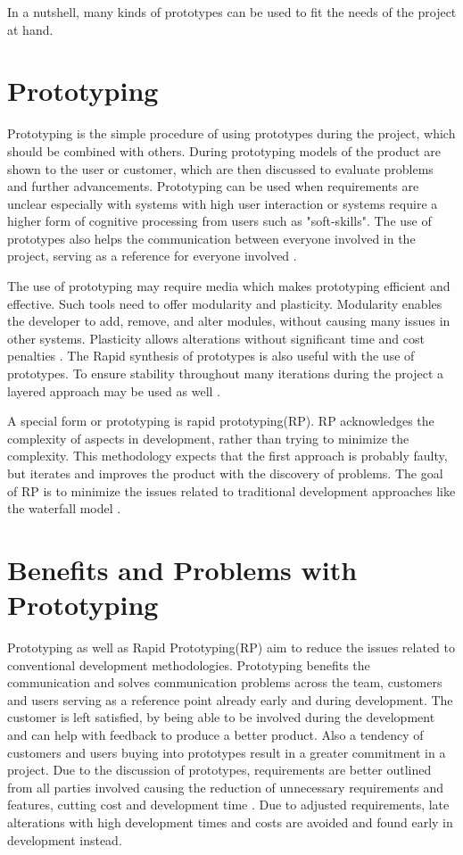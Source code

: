 \documentclass[runningheads]{llncs}
\begin{document}
In a nutshell, many kinds of prototypes can be used to fit the needs of the project at hand.

\section{Prototyping}
Prototyping is the simple procedure of using prototypes during the project, which should be combined with others\cite{ref_prac}. 
During prototyping models of the product are shown to the user or customer, which are then discussed to evaluate problems 
and further advancements. Prototyping can be used when requirements are unclear especially with systems with high user interaction 
or systems require a higher form of cognitive processing from users such as "soft-skills".
The use of prototypes also helps the communication between everyone involved in the project, serving as a reference for everyone 
involved \cite{ref_RPInAction}.

The use of prototyping may require media which makes prototyping efficient and effective. Such tools need to offer modularity and plasticity.
Modularity enables the developer to add, remove, and alter modules, without causing many issues in other systems. Plasticity allows alterations
without significant time and cost penalties \cite{ref_RPalternativeStrategy}. The Rapid synthesis of prototypes is also useful with the use of 
prototypes\cite{ref_RPalternativeStrategy}. To ensure stability throughout many iterations during the project a layered approach may be 
used as well \cite{ref_health}.

A special form or prototyping is rapid prototyping(RP). RP acknowledges the complexity of aspects in development, rather than trying to minimize 
the complexity. This methodology expects that the first approach is probably faulty, but iterates and improves the product with the discovery of
problems. The goal of RP is to minimize the issues related to traditional development approaches like the waterfall model \cite{ref_RPalternativeStrategy}.

\section{Benefits and Problems with Prototyping}
Prototyping as well as Rapid Prototyping(RP) aim to reduce the issues related to conventional development methodologies. Prototyping
benefits the communication and solves communication problems across the team, customers and users\cite{ref_RPalternativeStrategy} serving as a reference point already 
early and during development\cite{ref_prac}. The customer is left satisfied, by being able to be involved during the development 
and can help with feedback to produce a better product. Also a tendency of customers and users buying into prototypes result in a greater
commitment in a project. Due to the discussion of prototypes, requirements are better outlined from all parties involved causing the reduction
of unnecessary requirements and features, cutting cost and development time \cite{ref_prac}. Due to adjusted requirements, 
late alterations with high development times and costs are avoided and found early in development instead.
\end{document}

